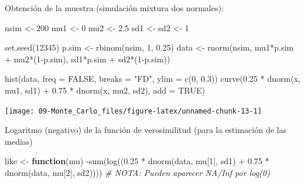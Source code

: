 \documentclass[
]{book}
\newenvironment{Shaded}{\begin{snugshade}}{\end{snugshade}}
\newcommand{\AttributeTok}[1]{\textcolor[rgb]{0.77,0.63,0.00}{#1}}
\newcommand{\CommentTok}[1]{\textcolor[rgb]{0.56,0.35,0.01}{\textit{#1}}}
\newcommand{\ConstantTok}[1]{\textcolor[rgb]{0.00,0.00,0.00}{#1}}
\newcommand{\ControlFlowTok}[1]{\textcolor[rgb]{0.13,0.29,0.53}{\textbf{#1}}}
\newcommand{\DecValTok}[1]{\textcolor[rgb]{0.00,0.00,0.81}{#1}}
\newcommand{\FloatTok}[1]{\textcolor[rgb]{0.00,0.00,0.81}{#1}}
\newcommand{\FunctionTok}[1]{\textcolor[rgb]{0.00,0.00,0.00}{#1}}
\newcommand{\NormalTok}[1]{#1}
\newcommand{\OtherTok}[1]{\textcolor[rgb]{0.56,0.35,0.01}{#1}}
\newcommand{\SpecialCharTok}[1]{\textcolor[rgb]{0.00,0.00,0.00}{#1}}
\newcommand{\StringTok}[1]{\textcolor[rgb]{0.31,0.60,0.02}{#1}}
\theoremstyle{break}
\theoremstyle{definition}
\theoremstyle{definition}
\theoremstyle{definition}
\theoremstyle{definition}
\theoremstyle{remark}
\begin{document}
Obtención de la muestra (simulación mixtura dos normales):

\begin{Shaded}
\begin{Highlighting}[]
\NormalTok{nsim }\OtherTok{\textless{}{-}} \DecValTok{200}
\NormalTok{mu1 }\OtherTok{\textless{}{-}} \DecValTok{0} 
\NormalTok{mu2 }\OtherTok{\textless{}{-}} \FloatTok{2.5}
\NormalTok{sd1 }\OtherTok{\textless{}{-}}\NormalTok{ sd2 }\OtherTok{\textless{}{-}} \DecValTok{1}

\FunctionTok{set.seed}\NormalTok{(}\DecValTok{12345}\NormalTok{)}
\NormalTok{p.sim }\OtherTok{\textless{}{-}} \FunctionTok{rbinom}\NormalTok{(nsim, }\DecValTok{1}\NormalTok{, }\FloatTok{0.25}\NormalTok{)}
\NormalTok{data }\OtherTok{\textless{}{-}} \FunctionTok{rnorm}\NormalTok{(nsim, mu1}\SpecialCharTok{*}\NormalTok{p.sim }\SpecialCharTok{+}\NormalTok{ mu2}\SpecialCharTok{*}\NormalTok{(}\DecValTok{1}\SpecialCharTok{{-}}\NormalTok{p.sim), sd1}\SpecialCharTok{*}\NormalTok{p.sim }\SpecialCharTok{+}\NormalTok{ sd2}\SpecialCharTok{*}\NormalTok{(}\DecValTok{1}\SpecialCharTok{{-}}\NormalTok{p.sim))}

\FunctionTok{hist}\NormalTok{(data, }\AttributeTok{freq =} \ConstantTok{FALSE}\NormalTok{, }\AttributeTok{breaks =} \StringTok{"FD"}\NormalTok{, }\AttributeTok{ylim =} \FunctionTok{c}\NormalTok{(}\DecValTok{0}\NormalTok{, }\FloatTok{0.3}\NormalTok{))}
\FunctionTok{curve}\NormalTok{(}\FloatTok{0.25} \SpecialCharTok{*} \FunctionTok{dnorm}\NormalTok{(x, mu1, sd1) }\SpecialCharTok{+} \FloatTok{0.75} \SpecialCharTok{*} \FunctionTok{dnorm}\NormalTok{(x, mu2, sd2), }\AttributeTok{add =} \ConstantTok{TRUE}\NormalTok{)}
\end{Highlighting}
\end{Shaded}

\begin{center}\texttt{[image: 09-Monte\_Carlo\_files/figure-latex/unnamed-chunk-13-1]} \end{center}

Logaritmo (negativo) de la función de verosimilitud
(para la estimación de las medias)

\begin{Shaded}
\begin{Highlighting}[]
\NormalTok{like }\OtherTok{\textless{}{-}} \ControlFlowTok{function}\NormalTok{(mu)}
  \SpecialCharTok{{-}}\FunctionTok{sum}\NormalTok{(}\FunctionTok{log}\NormalTok{((}\FloatTok{0.25} \SpecialCharTok{*} \FunctionTok{dnorm}\NormalTok{(data, mu[}\DecValTok{1}\NormalTok{], sd1) }\SpecialCharTok{+} \FloatTok{0.75} \SpecialCharTok{*} \FunctionTok{dnorm}\NormalTok{(data, mu[}\DecValTok{2}\NormalTok{], sd2))))}
  \CommentTok{\# NOTA: Pueden aparecer NA/Inf por log(0)}
\end{Highlighting}
\end{Shaded}
\end{document}
